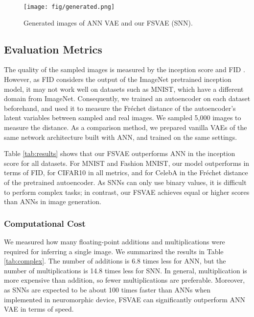 \documentclass[letterpaper]{article} %
\begin{document}
\begin{figure*}[t]
 \begin{center}
  \texttt{[image: fig/generated.png]}
  \caption{Generated images of ANN VAE and our FSVAE (SNN).}
  \label{fig:samples}
 \end{center}
\end{figure*}


\subsection{Evaluation Metrics}
The quality of the sampled images is measured by the inception score \cite{inceptionscore} and FID \cite{fid, cleanfid}. However, as FID considers the output of the ImageNet pretrained inception model, it may not work well on datasets such as MNIST, which have a different domain from ImageNet. Consequently, we trained an autoencoder on each dataset beforehand, and used it to measure the Fr\'echet distance of the autoencoder's latent variables between sampled and real images. We sampled 5,000 images to measure the distance. As a comparison method, we prepared vanilla VAEs of the same network architecture built with ANN, and trained on the same settings.

Table \ref{tab:results} shows that our FSVAE outperforms ANN in the inception score for all datasets. For MNIST and Fashion MNIST, our model outperforms in terms of FID, for CIFAR10 in all metrics, and for CelebA in the Fr\'echet distance of the pretrained autoencoder. As SNNs can only use binary values, it is difficult to perform complex tasks; in contrast, our FSVAE achieves equal or higher scores than ANNs in image generation.

\subsubsection{Computational Cost}
We measured how many floating-point additions and multiplications were required for inferring a single image. We summarized the results in Table \ref{tab:complex}. The number of additions is 6.8 times less for ANN, but the number of multiplications is 14.8 times less for SNN. In general, multiplication is more expensive than addition, so fewer multiplications are preferable. Moreover, as SNNs are expected to be about 100 times faster than ANNs when implemented in neuromorphic device, FSVAE can significantly outperform ANN VAE in terms of speed.
\end{document}
